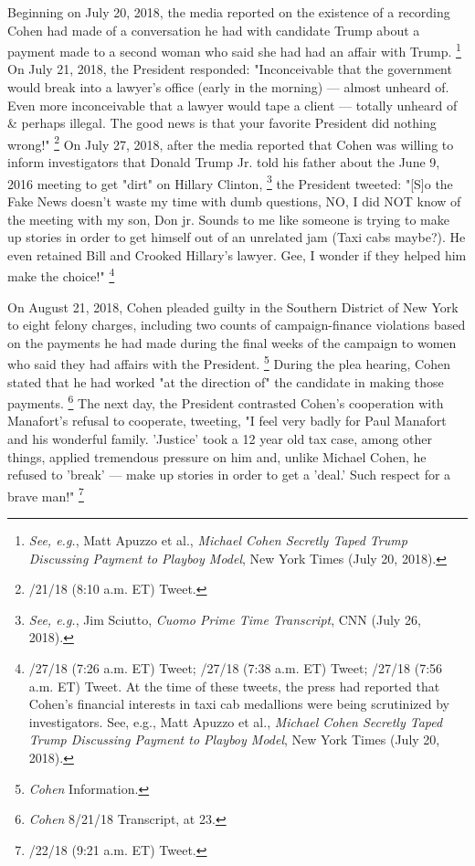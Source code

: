 {Beginning on July 20, 2018, the media reported on the existence of a recording Cohen had made of a conversation he had with candidate Trump about a payment made to a second woman who said she had had an affair with Trump.%
\footnote{\textit{See, e.g.}, Matt Apuzzo et al., \textit{Michael Cohen Secretly Taped Trump Discussing Payment to Playboy Model}, New York Times (July 20, 2018).}
On July 21, 2018, the President responded: "Inconceivable that the government would break into a lawyer's office (early in the morning) — almost unheard of.
Even more inconceivable that a lawyer would tape a client — totally unheard of \& perhaps illegal.
The good news is that your favorite President did nothing wrong!"%
\footnote{/21/18 (8:10 a.m. ET) Tweet.}
On July 27, 2018, after the media reported that Cohen was willing to inform investigators that Donald Trump Jr. told his father about the June 9, 2016 meeting to get "dirt" on Hillary Clinton,%
\footnote{\textit{See, e.g.}, Jim Sciutto, \textit{Cuomo Prime Time Transcript}, CNN (July 26, 2018).}
the President tweeted:
"[S]o the Fake News doesn't waste my time with dumb questions, NO, I did NOT know of the meeting with my son, Don jr.
Sounds to me like someone is trying to make up stories in order to get himself out of an unrelated jam (Taxi cabs maybe?).
He even retained Bill and Crooked Hillary's lawyer.
Gee, I wonder if they helped him make the choice!"%
\footnote{/27/18 (7:26 a.m. ET) Tweet;
/27/18 (7:38 a.m. ET) Tweet;
/27/18 (7:56 a.m. ET) Tweet.
At the time of these tweets, the press had reported that Cohen’s financial interests in taxi cab medallions were being scrutinized by investigators.
See, e.g., Matt Apuzzo et al., \textit{Michael Cohen Secretly Taped Trump Discussing Payment to Playboy Model}, New York Times (July 20, 2018).}

On August 21, 2018, Cohen pleaded guilty in the Southern District of New York to eight felony charges, including two counts of campaign-finance violations based on the payments he had made during the final weeks of the campaign to women who said they had affairs with the President.%
\footnote{\textit{Cohen} Information.}
During the plea hearing, Cohen stated that he had worked "at the direction of" the candidate in making those payments.%
\footnote{\textit{Cohen} 8/21/18 Transcript, at 23.}
The next day, the President contrasted Cohen's cooperation with Manafort's refusal to cooperate, tweeting, "I feel very badly for Paul Manafort and his wonderful family.
'Justice' took a 12 year old tax case, among other things, applied tremendous pressure on him and, unlike Michael Cohen, he refused to 'break' — make up stories in order to get a 'deal.'
Such respect for a brave man!"%
\footnote{/22/18 (9:21 a.m. ET) Tweet.}

}
